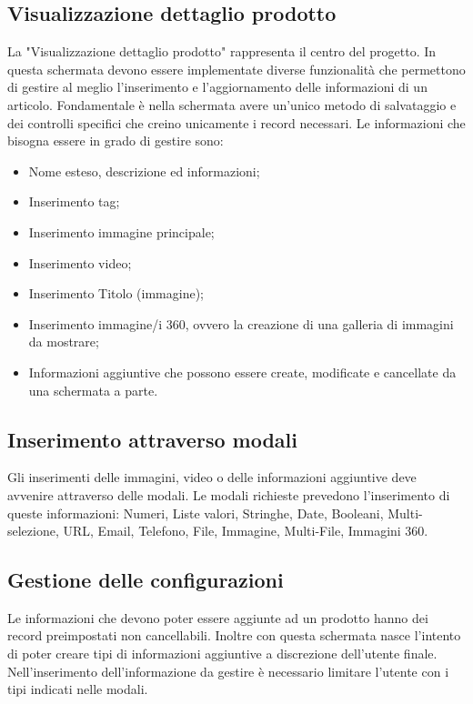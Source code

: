 \subsection{Visualizzazione dettaglio prodotto}
La "Visualizzazione dettaglio prodotto" rappresenta il centro del progetto. In questa schermata devono essere implementate diverse funzionalità che permettono di gestire al meglio l'inserimento e l'aggiornamento delle informazioni di un articolo. Fondamentale è nella schermata avere un'unico metodo di salvataggio e dei controlli specifici che creino unicamente i record necessari. 
Le informazioni che bisogna essere in grado di gestire sono:
\begin{itemize}
	\item Nome esteso, descrizione ed informazioni;
	\item Inserimento tag;
	\item Inserimento immagine principale;
	\item Inserimento video;
	\item Inserimento Titolo (immagine);
	\item Inserimento immagine/i 360, ovvero la creazione di una galleria di immagini da mostrare;
	\item Informazioni aggiuntive che possono essere create, modificate e cancellate da una schermata a parte.
\end{itemize}

\subsection{Inserimento attraverso modali}
Gli inserimenti delle immagini, video o delle informazioni aggiuntive deve avvenire attraverso delle modali. Le modali richieste prevedono l'inserimento di queste informazioni: Numeri, Liste valori, Stringhe, Date, Booleani, Multi-selezione, URL, Email, Telefono, File, Immagine, Multi-File, Immagini 360.

\subsection{Gestione delle configurazioni}
Le informazioni che devono poter essere aggiunte ad un prodotto hanno dei record preimpostati non cancellabili. Inoltre con questa schermata nasce l'intento di poter creare tipi di informazioni aggiuntive a discrezione dell'utente finale.
Nell'inserimento dell'informazione da gestire è necessario limitare l'utente con i tipi indicati nelle modali.

